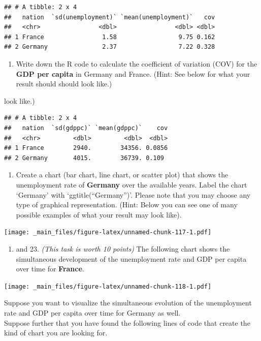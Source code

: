 \documentclass[
  12pt,
  oneside]{book}
\providecommand{\tightlist}{%
  \setlength{\itemsep}{0pt}\setlength{\parskip}{0pt}}
\begin{document}
\begin{verbatim}
## # A tibble: 2 x 4
##   nation  `sd(unemployment)` `mean(unemployment)`   cov
##   <chr>                <dbl>                <dbl> <dbl>
## 1 France                1.58                 9.75 0.162
## 2 Germany               2.37                 7.22 0.328
\end{verbatim}

\begin{enumerate}
\def\labelenumi{(\arabic{enumi})}
\setcounter{enumi}{19}
\tightlist
\item
  Write down the R code to calculate the coefficient of variation (COV) for the \textbf{GDP per capita}
  in Germany and France. (Hint: See below for what your result should should look like.)
\end{enumerate}

look like.)

\begin{verbatim}
## # A tibble: 2 x 4
##   nation  `sd(gdppc)` `mean(gdppc)`    cov
##   <chr>         <dbl>         <dbl>  <dbl>
## 1 France        2940.        34356. 0.0856
## 2 Germany       4015.        36739. 0.109
\end{verbatim}

\begin{enumerate}
\def\labelenumi{(\arabic{enumi})}
\setcounter{enumi}{20}
\tightlist
\item
  Create a chart (bar chart, line chart, or scatter plot) that shows the
  unemployment rate of \textbf{Germany} over the available years. Label the chart
  `Germany' with `ggtitle(``Germany'')'. Please note that you may choose any type of graphical representation.
  (Hint: Below you can see one of many possible examples of what your result may look like).
\end{enumerate}

\texttt{[image: \_main\_files/figure-latex/unnamed-chunk-117-1.pdf]}

\begin{enumerate}
\def\labelenumi{(\arabic{enumi})}
\setcounter{enumi}{21}
\tightlist
\item
  and 23. \emph{(This task is worth 10 points)}
  The following chart shows the simultaneous development of the unemployment rate and GDP per capita over time for \textbf{France}.
\end{enumerate}

\texttt{[image: \_main\_files/figure-latex/unnamed-chunk-118-1.pdf]}

Suppose you want to visualize the simultaneous evolution of the unemployment rate and GDP per capita over time for Germany as well.\\
Suppose further that you have found the following lines of code that create the kind of chart you are looking for.
\end{document}
